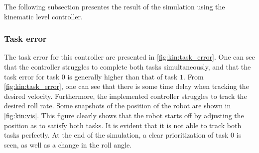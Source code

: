 The following subsection presentes the result of the simulation using the
kinematic level controller.

\subsubsection{Task error}

The task error for this controller are presented in \autoref{fig:kin:task_error}.
One can see that the controller struggles to complete both tasks simultaneously,
and that the task error for task $0$ is generally higher than that of task $1$.
From \autoref{fig:kin:task_error}, one can see that there is some time delay
when tracking the desired velocity. Furthermore, the implemented controller
struggles to track the desired roll rate. Some snapshots of the position of the
robot are shown in \autoref{fig:kin:vis}. This figure clearly shows that the
robot starts off by adjusting the position as to satisfy both tasks. It is evident
that it is not able to track both tasks perfectly. At the end of the simulation,
a clear prioritization of task $0$ is seen, as well as a change in the roll angle.

